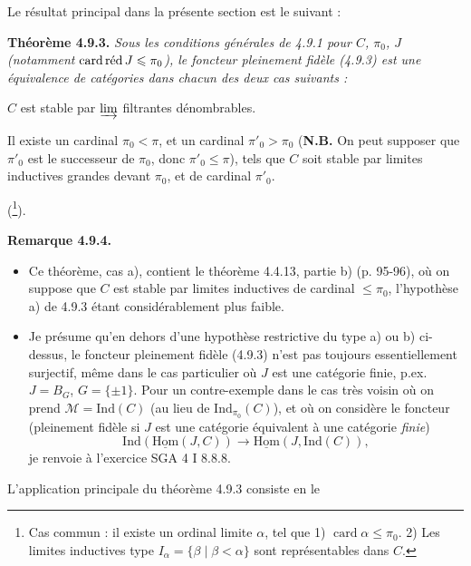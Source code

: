 \documentclass[11pt]{article}
\newcommand{\printedpage}[1]{\marginpar{\footnotesize p.~#1}}
\newcommand{\msp}[1]{\marginpar{\footnotesize [#1]}}
\newcommand{\uHom}{\underline{\mathrm{Hom}}}
\newcommand{\Ind}{\mathrm{Ind}}
\newcommand{\card}{\operatorname{card}}
\newcommand{\cardred}{\mathop{\textup{card\,réd}}\nolimits}
\newcommand{\cM}{\mathcal{M}}
\newcommand{\circled}[1]{\tikz[baseline=(c.base)]\node[draw,circle,inner sep=1pt](c){#1};}
\begin{document}
\sbox{\dctauAB}{\circled{$\scriptstyle\tau_{\alpha,\beta}$}}
\sbox{\dctauABone}{\circled{$\scriptstyle\tau_{\alpha,\beta+1}$}}
\sbox{\dctauAAzero}{\circled{$\scriptstyle\tau_{\alpha,\alpha_0}$}}
\printedpage{79}

Le résultat principal dans la présente section est le suivant :

\textbf{Théorème 4.9.3.} \textit{Sous les conditions générales de 4.9.1 pour $C$, $\pi_0$, $J$ (notamment} $\cardred J \leqslant \pi_0$\textit{), le foncteur pleinement fidèle (4.9.3) est une équivalence de catégories dans chacun des deux cas suivants :}
\begin{itemize}[label={}]
{\itshape
\item[a)] $C$ est stable par $\varinjlim$ filtrantes dénombrables.
\item[b)] Il existe un cardinal $\pi_0 < \pi$, et un cardinal $\pi'_0 > \pi_0$ \textup{(}\textbf{\upshape N.B.} On peut supposer que $\pi'_0$ est le successeur de $\pi_0$, donc $\pi'_0 \leqslant \pi$), tels que $C$ soit stable par limites inductives grandes devant $\pi_0$, et de cardinal $\pi'_0$.
}
\end{itemize}
(\footnote[94]{Cas commun : il existe un ordinal limite $\alpha$, tel que 1) $\card \alpha \leqslant \pi_0$. 2) Les limites inductives type $I_\alpha = \{\beta \mid \beta < \alpha\}$ sont représentables dans $C$.}).

\textbf{Remarque 4.9.4.}
\begin{itemize}[label={}]
\item[a)] Ce théorème, cas a), contient le théorème 4.4.13, partie b) (p. 95-96), où on suppose que $C$ est stable par limites inductives de cardinal $\leqslant \pi_0$, l'hypothèse a) de 4.9.3 étant considérablement plus faible.
\item[b)] \msp{page 220}Je présume qu'en dehors d'une hypothèse restrictive du type a) ou b) ci-dessus, le foncteur pleinement fidèle (4.9.3) n'est pas toujours essentiellement surjectif, même dans le cas particulier où $J$ est une catégorie finie, p.ex. $J = B_G$, $G = \{\pm 1\}$. Pour un contre-exemple dans le cas très voisin où on prend $\cM = \Ind(C)$ (au lieu de $\Ind_{\pi_0}(C)$), et où on considère le foncteur (pleinement fidèle si $J$ est une catégorie équivalent à une catégorie \textit{finie}) %
\[
\Ind(\uHom(J,C)) \longrightarrow \uHom(J,\Ind(C)),
\]
je renvoie à l'exercice SGA 4 I 8.8.8.
\end{itemize}
L'application principale du théorème 4.9.3 consiste en le
\end{document}
